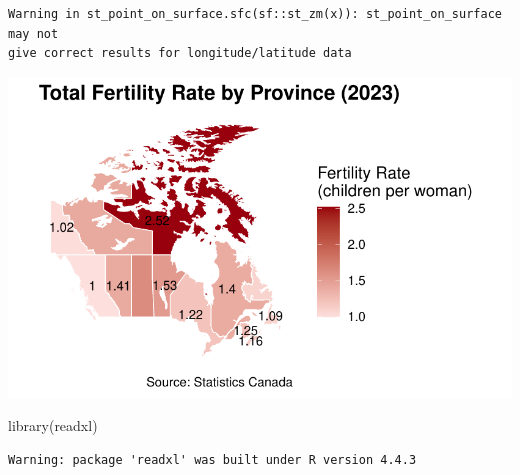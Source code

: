 \documentclass[
  letterpaper,
  DIV=11,
  numbers=noendperiod]{scrartcl}
\newenvironment{Shaded}{\begin{snugshade}}{\end{snugshade}}
\newcommand{\FunctionTok}[1]{\textcolor[rgb]{0.28,0.35,0.67}{#1}}
\newcommand{\NormalTok}[1]{\textcolor[rgb]{0.00,0.23,0.31}{#1}}
\begin{document}
\begin{verbatim}
Warning in st_point_on_surface.sfc(sf::st_zm(x)): st_point_on_surface may not
give correct results for longitude/latitude data
\end{verbatim}

\includegraphics{paper_files/figure-pdf/unnamed-chunk-3-1.pdf}

\begin{Shaded}
\begin{Highlighting}[]
\FunctionTok{library}\NormalTok{(readxl)}
\end{Highlighting}
\end{Shaded}

\begin{verbatim}
Warning: package 'readxl' was built under R version 4.4.3
\end{verbatim}
\end{document}
